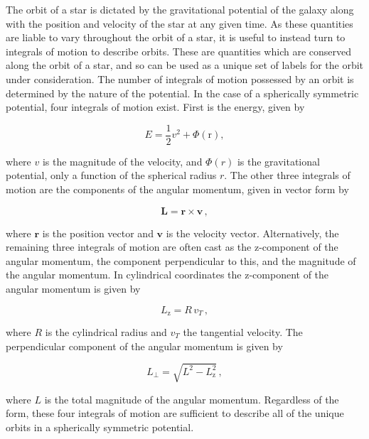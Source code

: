 The orbit of a star is dictated by the gravitational potential of the galaxy along with the position and velocity of the star at any given time. As these quantities are liable to vary throughout the orbit of a star, it is useful to instead turn to integrals of motion to describe orbits. These are quantities which are conserved along the orbit of a star, and so can be used as a unique set of labels for the orbit under consideration. The number of integrals of motion possessed by an orbit is determined by the nature of the potential. In the case of a spherically symmetric potential, four integrals of motion exist. First is the energy, given by 

\begin{equation}
    \label{ch1:eq:energy}
    E = \frac{1}{2}v^2 + \Phi(\mathbf{\mathrm{r}}),
\end{equation}

\noindent where $v$ is the magnitude of the velocity, and $\Phi(r)$ is the gravitational potential, only a function of the spherical radius $r$. The other three integrals of motion are the components of the angular momentum, given in vector form by

\begin{equation}
    \label{ch1:eq:angular-momentum}
    \mathbf{L} = \mathbf{r} \times \mathbf{v}\,,
\end{equation}

\noindent where $\mathbf{r}$ is the position vector and $\mathbf{v}$ is the velocity vector. Alternatively, the remaining three integrals of motion are often cast as the z-component of the angular momentum, the component perpendicular to this, and the magnitude of the angular momentum. In cylindrical coordinates the z-component of the angular momentum is given by

\begin{equation}
    \label{ch1:eq:z-angular-momentum}
    L_\mathrm{z} = R \, v_{T}\,,
\end{equation}

\noindent where $R$ is the cylindrical radius and $v_{T}$ the tangential velocity. The perpendicular component of the angular momentum is given by

\begin{equation}
    \label{ch1:eq:perpendicular-angular-momentum}
    L_{\perp} = \sqrt{ L^{2} - L_{\mathrm{z}}^{2} }\,,
\end{equation}

\noindent where $L$ is the total magnitude of the angular momentum. Regardless of the form, these four integrals of motion are sufficient to describe all of the unique orbits in a spherically symmetric potential.

